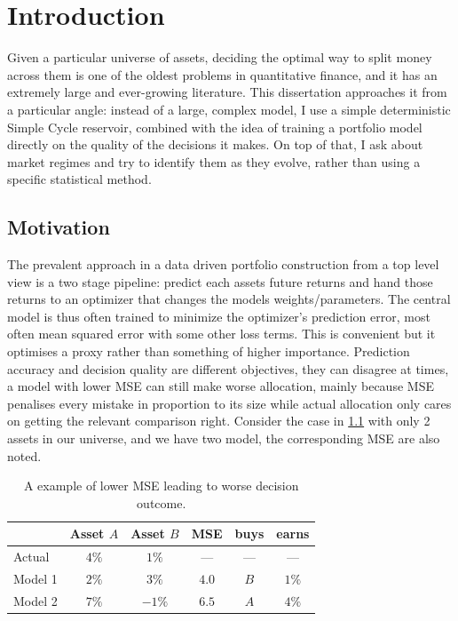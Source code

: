 
\chapter{Introduction}
\label{ch:introduction}

Given a particular universe of assets, deciding the optimal way to split money across them is one of the oldest problems in quantitative finance, and it has an extremely large and ever-growing literature. This dissertation approaches it from a particular angle: instead of a large, complex model, I use a simple deterministic Simple Cycle reservoir, combined with the idea of training a portfolio model directly on the quality of the decisions it makes. On top of that, I ask about market regimes and try to identify them as they evolve, rather than using a specific statistical method. 



\section{Motivation}
\label{sec:motivation}

The prevalent approach in a data driven portfolio construction from a top level view is a two stage pipeline: predict each assets future returns and hand those returns to an optimizer that changes the models weights/parameters. The central model is thus often trained to minimize the optimizer's prediction error, most often mean squared error with some other loss terms. This is convenient but it optimises a proxy rather than something of higher importance. Prediction accuracy and decision quality are different objectives, they can disagree at times, a model with lower MSE can still make worse allocation, mainly because MSE penalises every mistake in proportion to its size while actual allocation only cares on getting the relevant comparison right. Consider the case in \ref{tab:mse-vs-decision} with only 2 assets in our universe, and we have two model, the corresponding MSE are also noted. 

\begin{table}[t]
  \centering
  \begin{tabular}{lccccc}
    \hline
             & Asset $A$ & Asset $B$ & MSE & buys & earns \\
    \hline
    Actual   & $4\%$ & $1\%$   & ---   & ---  & ---   \\
    Model 1  & $2\%$ & $3\%$   & $4.0$ & $B$  & $1\%$ \\
    Model 2  & $7\%$ & $-1\%$  & $6.5$ & $A$  & $4\%$ \\
    \hline
  \end{tabular}
  \caption{A example of lower MSE leading to worse decision outcome.}
  \label{tab:mse-vs-decision}
\end{table}

